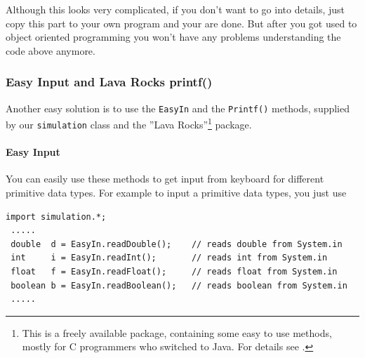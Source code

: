 Although this looks very complicated, if you don't want to go into
details, just copy this part to your own program and your are done.
But after you got used to object oriented programming you won't have
any problems understanding the code above anymore.

\subsubsection{Easy Input and Lava Rocks printf()}
\label{sec:LavaRocks}
Another easy solution is to use the \verb|EasyIn| and the
\verb|Printf()| methods, supplied by our \verb|simulation| class
and the ''Lava Rocks''\footnote{This is a freely available package,
containing some easy to use methods, mostly for C programmers
who switched to Java. For details see \cite{LavaRocks}.} package.

\paragraph{Easy Input}
You can easily use these methods to get input from keyboard
for different primitive data types. For example to input
a primitive data types, you just use
\begin{small}
\begin{verbatim}
import simulation.*;
 .....
 double  d = EasyIn.readDouble();    // reads double from System.in
 int     i = EasyIn.readInt();       // reads int from System.in
 float   f = EasyIn.readFloat();     // reads float from System.in
 boolean b = EasyIn.readBoolean();   // reads boolean from System.in
 .....
\end{verbatim}
\end{small}

